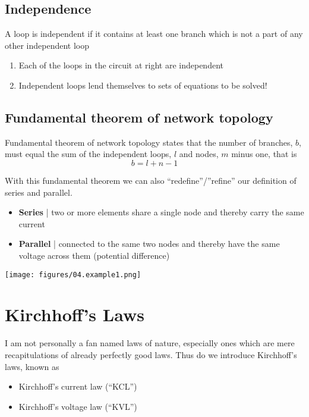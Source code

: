 \documentclass[11pt]{book}
\begin{document}
\subsection{Independence}
A loop is independent if it contains at least one branch which is not a part of any other independent loop
\begin{enumerate}
	\item Each of the loops in the circuit at right are independent 
	\item Independent loops lend themselves to sets of equations to be solved!
\end{enumerate}

\subsection{Fundamental theorem of network topology}
Fundamental theorem of network topology states that the number of branches, $b$, must equal the sum of the independent loops, $l$ and nodes, $m$ minus one, that is
\begin{equation}
	b = l + n - 1
\end{equation}

With this fundamental theorem we can also “redefine”/”refine” our definition of series and parallel.
\begin{itemize}
	\item \textbf{Series} | two or more elements share a single node and thereby carry the same current
	\item \textbf{Parallel} | connected to the same two nodes and thereby have the same voltage across them (potential difference)
\end{itemize}

\begin{center}
	\texttt{[image: figures/04.example1.png]}
\end{center}

 
\newpage
\section{Kirchhoff's Laws}
I am not personally a fan named laws of nature, especially ones which are mere recapitulations of already perfectly good laws. Thus do we introduce Kirchhoff’s laws, known as 
\begin{itemize}
	\item Kirchhoff’s current law (``KCL'') 
	\item Kirchhoff’s voltage law (``KVL'')  
\end{itemize}
	
\end{document}
